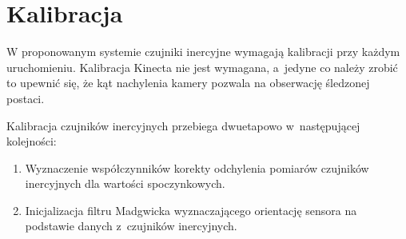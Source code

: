 \section{Kalibracja}
W proponowanym systemie czujniki inercyjne wymagają kalibracji przy każdym uruchomieniu. Kalibracja Kinecta nie jest wymagana, a~jedyne co należy zrobić to upewnić się, że kąt nachylenia kamery pozwala na obserwację śledzonej postaci.
		
Kalibracja czujników inercyjnych przebiega dwuetapowo w~następującej kolejności:
\begin{enumerate}
	\item {Wyznaczenie współczynników korekty odchylenia pomiarów czujników inercyjnych dla wartości spoczynkowych.} 
	\item {Inicjalizacja filtru Madgwicka wyznaczającego orientację sensora na podstawie danych z~czujników inercyjnych.}
\end{enumerate}
		
